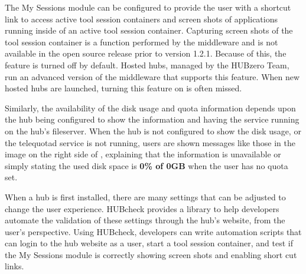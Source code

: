 The My Sessions module can be configured to provide the user with a shortcut
link to access active tool session containers and screen shots of applications
running inside of an active tool session container.  Capturing screen shots of
the tool session container is a function performed by the middleware and is not
available in the open source release prior to version 1.2.1. Because of this,
the feature is turned off by default. Hosted hubs, managed by the HUBzero Team,
run an advanced version of the middleware that supports this feature. When new
hosted hubs are launched, turning this feature on is often missed.

Similarly, the availability of the disk usage and quota information depends
upon the hub being configured to show the information and having the
service running on the hub's fileserver. When the hub is not configured to show
the disk usage, or the telequotad service is not running, users are shown
messages like those in the image on the right side of
, explaining that the information is
unavailable or simply stating the used disk space is \textbf{0\% of 0GB} when
the user has no quota set.

When a hub is first installed, there are many settings that can be adjusted to
change the user experience. HUBcheck provides a library to help developers
automate the validation of these settings through the hub's website, from the
user's perspective. Using HUBcheck, developers can write automation scripts
that can login to the hub website as a user, start a tool session container,
and test if the My Sessions module is correctly showing screen shots and
enabling short cut links.




